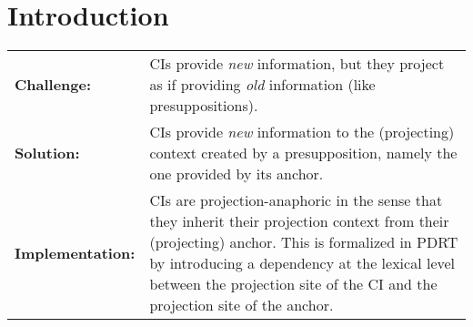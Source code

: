 \section{Introduction}\label{Introduction}


\begin{tabular}{p{} p{}}
  \textbf{Challenge:} & CIs provide \textit{new} information, but they
                        project as if providing \textit{old} information
                        (like presuppositions).\\

   \textbf{Solution:} & CIs provide \textit{new} information to the
                        (projecting) context created by a presupposition,
                        namely the one provided by its anchor.\\

\textbf{Implementation:} & CIs are projection-anaphoric in the sense that
                        they inherit their projection context from their
                        (projecting) anchor. This is formalized in PDRT
                        \citep{venhuizen2013iwcs} by introducing a dependency
                        at the lexical level between the projection site of
                        the CI and the projection site of the anchor.
\end{tabular}

